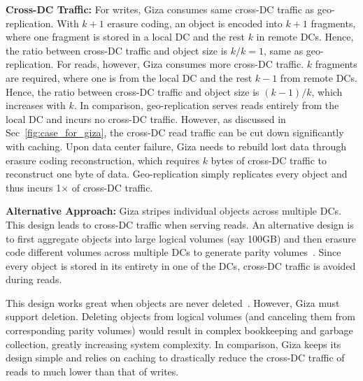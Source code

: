 {\bf Cross-DC Traffic:} For writes, Giza consumes same cross-DC traffic as
geo-replication. With $k+1$ erasure coding, an object is encoded into $k+1$
fragments, where one fragment is stored in a local DC and the rest $k$ in remote
DCs. Hence, the ratio between cross-DC traffic and object size is $k/k = 1$,
same as geo-replication. For reads, however, Giza consumes more cross-DC
traffic. $k$ fragments are required, where one is from the local DC and the rest
$k-1$ from remote DCs. Hence, the ratio between cross-DC traffic and object size
is $(k-1)/k$, which increases with $k$. In comparison, geo-replication serves
reads entirely from the local DC and incurs no cross-DC traffic. However, as
discussed in Sec~\ref{fig:case_for_giza}, the cross-DC read traffic can be cut
down significantly with caching. Upon data center failure, Giza needs to rebuild
lost data through erasure coding reconstruction, which requires $k$ bytes of
cross-DC traffic to reconstruct one byte of data. Geo-replication simply
replicates every object and thus incurs 1$\times$ of cross-DC traffic.

{\bf Alternative Approach:} Giza stripes individual objects across multiple DCs. This design leads to cross-DC traffic when serving reads. An alternative design is to first aggregate objects into large logical volumes (say 100GB) and then erasure code different volumes across multiple DCs to generate parity volumes~\cite{f4:osdi14}. Since every object is stored in its entirety in one of the DCs, cross-DC traffic is avoided during reads.

This design works great when objects are never deleted~\cite{f4:osdi14}. However, Giza must support deletion. Deleting objects from logical volumes (and canceling them from corresponding parity volumes) would result in complex bookkeeping and garbage collection, greatly increasing system complexity. In comparison, Giza keeps its design simple and relies on caching to drastically reduce the cross-DC traffic of reads to much lower than that of writes. 